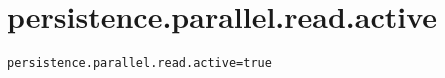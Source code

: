 \section{persistence.parallel.read.active}
\label{configuration:PersistenceParallelReadActive}
\ClearAPI
\TODO
{}
\begin{lstlisting}[style=Props,caption={Usage example for \textit{persistence.parallel.read.active}}]
persistence.parallel.read.active=true
\end{lstlisting}